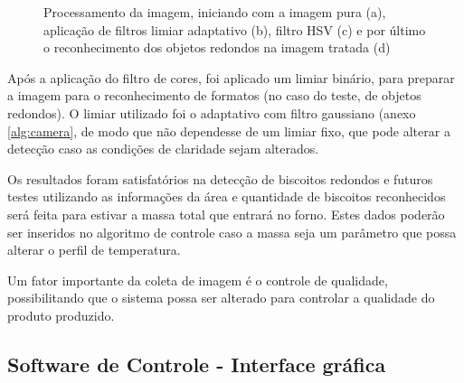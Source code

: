 \begin{figure}[htbp]
    \caption{Processamento da imagem, iniciando com a imagem pura (a), aplicação de filtros limiar adaptativo (b), filtro HSV (c) e por último o reconhecimento dos objetos redondos na imagem tratada (d)}
    \label{fig:opencv}
\end{figure}

Após a aplicação do filtro de cores, foi aplicado um limiar binário, para preparar a imagem para o reconhecimento de formatos (no caso do teste, de objetos redondos). O limiar utilizado foi o adaptativo com filtro gaussiano (anexo \ref{alg:camera}, de modo que não dependesse de um limiar fixo, que pode alterar a detecção caso as condições de claridade sejam alterados.

Os resultados foram satisfatórios na detecção de biscoitos redondos e futuros testes utilizando as informações da área e quantidade de biscoitos reconhecidos será feita para estivar a massa total que entrará no forno. Estes dados poderão ser inseridos no algoritmo de controle caso a massa seja um parâmetro que possa alterar o perfil de temperatura.

Um fator importante da coleta de imagem é o controle de qualidade, possibilitando que o sistema possa ser alterado para controlar a qualidade do produto produzido. 

\subsection{Software de Controle - Interface gráfica}

